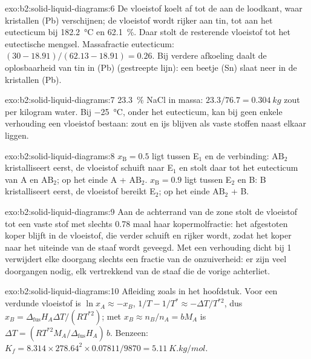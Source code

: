 \begin{solution}{exo:b2:solid-liquid-diagrams:6}
De vloeistof koelt af tot de  aan de loodkant, waar kristallen (Pb) verschijnen; de
vloeistof wordt rijker aan tin, tot aan het eutecticum bij \qty{182.2}{\degreeCelsius}
en 62.1~\%. Daar stolt de resterende vloeistof tot het eutectische mengsel.
Massafractie eutecticum: $(30 - 18.91)/(62.13 - 18.91) = 0.26$. Bij verdere
afkoeling daalt de oplosbaarheid van tin in (Pb) (gestreepte lijn): een beetje (Sn)
slaat neer in de kristallen (Pb).
\end{solution}

\begin{solution}{exo:b2:solid-liquid-diagrams:7}
23.3~\% NaCl in massa: $23.3/76.7 = \qty{0.304}{kg}$ zout per kilogram
water. Bij \qty{-25}{\degreeCelsius}, onder het eutecticum, kan bij geen enkele verhouding
een vloeistof bestaan: zout en ijs blijven als vaste stoffen naast elkaar liggen.
\end{solution}

\begin{solution}{exo:b2:solid-liquid-diagrams:8}
$x_{\mathrm B} = 0.5$ ligt tussen E$_1$ en de verbinding: $\mathrm{AB_2}$
kristalliseert eerst, de vloeistof schuift naar E$_1$ en stolt daar tot het
eutecticum van A en $\mathrm{AB_2}$; op het einde A + $\mathrm{AB_2}$.
$x_{\mathrm B} = 0.9$ ligt tussen E$_2$ en B: B kristalliseert eerst, de vloeistof
bereikt E$_2$; op het einde $\mathrm{AB_2}$ + B.
\end{solution}

\begin{solution}{exo:b2:solid-liquid-diagrams:9}
Aan de achterrand van de zone stolt de vloeistof tot een vaste stof met slechts 0.78
maal haar kopermolfractie: het afgestoten koper blijft in de vloeistof, die
verder schuift en rijker wordt, zodat het koper naar het uiteinde van de staaf wordt geveegd.
Met een verhouding dicht bij 1 verwijdert elke doorgang slechts een fractie van de onzuiverheid:
er zijn veel doorgangen nodig, elk vertrekkend van de staaf die de vorige achterliet.
\end{solution}

\begin{solution}{exo:b2:solid-liquid-diagrams:10}
Afleiding zoals in het hoofdstuk. Voor een verdunde vloeistof is $\ln x_A \approx -x_B$, $1/T -
1/T^* \approx -\Delta T/T^{*2}$, dus $x_B = \Delta_{\text{fus}}H_A\Delta T/(RT^{*2})$;
met $x_B \approx n_B/n_A = bM_A$ is $\Delta T = (RT^{*2}M_A/\Delta_{\text{fus}}H_A)\,b$.
Benzeen: $K_f = 8.314 \times 278.64^2 \times 0.07811/9870 = \qty{5.11}{K.kg/mol}$.
\end{solution}

